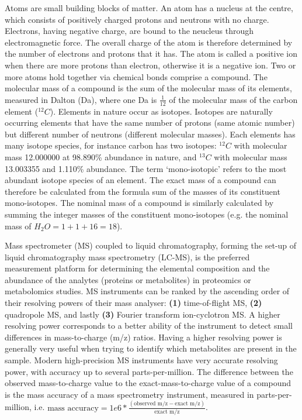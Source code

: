 Atoms are small building blocks of matter. An atom has a nucleus at the centre, which consists of positively charged protons and neutrons with no charge. Electrons, having negative charge, are bound to the neucleus through electromagnetic force. The overall charge of the atom is therefore determined by the number of electrons and protons that it has. The atom is called a positive ion when there are more protons than electron, otherwise it is a negative ion. Two or more atoms hold together via chemical bonds comprise a compound. The molecular mass of a compound is the sum of the molecular mass of its elements, measured in Dalton (Da), where one Da is $\frac{1}{12}$ of the molecular mass of the carbon element ($^{12}C$). Elements in nature occur as isotopes. Isotopes are naturally occurring elements that have the same number of protons (same atomic number) but different number of neutrons (different molecular masses). Each elements has many isotope species, for instance carbon has two isotopes: $^{12}C$ with molecular mass 12.000000 at 98.890\% abundance in nature, and $^{13}C$ with molecular mass 13.003355 and 1.110\% abundance. The term `mono-isotopic' refers to the most abundant isotope species of an element. The exact mass of a compound can therefore be calculated from the formula sum of the masses of its constituent mono-isotopes. The nominal mass of a compound is similarly calculated by summing the integer masses of the constituent mono-isotopes (e.g. the nominal mass of $H_2O=1+1+16=18$).

Mass spectrometer (MS) coupled to liquid chromatography, forming the set-up of liquid chromatography mass spectrometry (LC-MS), is the preferred measurement platform for determining the elemental composition and the abundance of the analytes (proteins or metabolites) in proteomics or metabolomics studies. MS instruments can be ranked by the ascending order of their resolving powers of their mass analyser: \textbf{(1)} time-of-flight MS, \textbf{(2)} quadropole MS, and lastly \textbf{(3)} Fourier transform ion-cyclotron MS. A higher resolving power corresponds to a better ability of the instrument to detect small differences in mass-to-charge (m/z) ratios. Having a higher resolving power is generally very useful when trying to identify which metabolites are present in the sample. Modern high-precision MS instruments have very accurate resolving power, with accuracy up to several parts-per-million. The difference between the observed mass-to-charge value to the exact-mass-to-charge value of a compound is the mass accuracy of a mass spectrometry instrument, measured in parts-per-million, i.e. $\text{mass accuracy} = 1e6 * \frac{(\text{observed m/z} - \text{exact m/z})}{\text{exact m/z}}$. 

